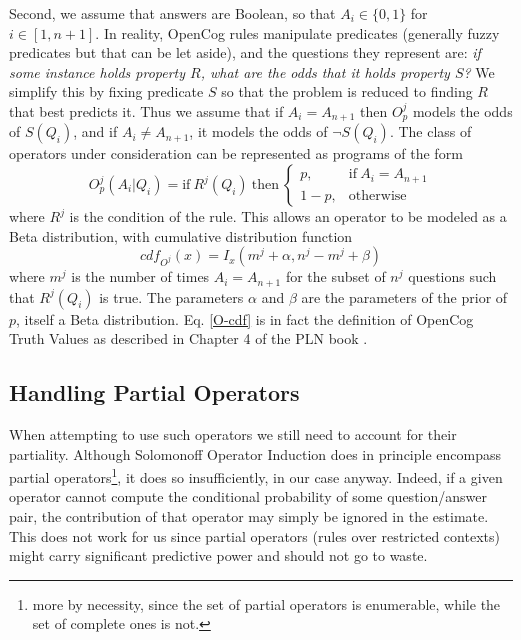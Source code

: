 \documentclass[runningheads]{llncs}
\begin{document}
Second, we assume that answers are Boolean, so that $A_i\in \{0, 1\}$
for $i \in [1, n+1]$. In reality, OpenCog rules manipulate predicates
(generally fuzzy predicates but that can be let aside), and the
questions they represent are: {\it if some instance holds property
  $R$, what are the odds that it holds property $S$?} We simplify this
by fixing predicate $S$ so that the problem is reduced to finding $R$
that best predicts it. Thus we assume that if $A_i=A_{n+1}$ then
$O^j_p$ models the odds of $S(Q_i)$, and if $A_i \neq A_{n+1}$, it
models the odds of $\neg S(Q_i)$. The class of operators under
consideration can be represented as programs of the form
\begin{equation}
O^j_p(A_i|Q_i) = \text{if}\ R^j(Q_i)\ \text{then}\
\begin{cases}
  p, & \text{if}\ A_i = A_{n+1}\\
  1-p, & \text{otherwise}
\end{cases}
\end{equation}
where $R^j$ is the condition of the rule. This allows an operator to
be modeled as a Beta distribution, with cumulative distribution
function
\begin{equation}
  \label{O-cdf}
  cdf_{O^j}(x) = I_x(m^j + \alpha, n^j-m^j+\beta)
\end{equation}
where $m^j$ is the number of times $A_i = A_{n+1}$ for the subset of
$n^j$ questions such that $R^j(Q_i)$ is true. The parameters $\alpha$
and $\beta$ are the parameters of the prior of $p$, itself a Beta
distribution. Eq. \ref{O-cdf} is in fact the definition of OpenCog
Truth Values as described in Chapter 4 of the PLN book
\cite{Goertzel09PLN}.

\subsection{Handling Partial Operators}
When attempting to use such operators we still need to account for
their partiality. Although Solomonoff Operator Induction does in
principle encompass partial operators\footnote{more by necessity,
  since the set of partial operators is enumerable, while the set of
  complete ones is not.}, it does so insufficiently, in our case
anyway. Indeed, if a given operator cannot compute the conditional
probability of some question/answer pair, the contribution of that
operator may simply be ignored in the estimate. This does not work for
us since partial operators (rules over restricted contexts) might
carry significant predictive power and should not go to waste.
\end{document}
